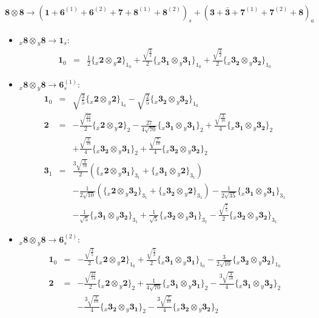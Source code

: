 \documentclass[english]{article}
\newcommand{\rep}[1]{\mathbf{#1}}
\newcommand{\repx}[2]{{}_{#2}\mathbf{#1}}
\newcommand{\subcg}[3]{\big\{ \repx{#1}{x}\otimes\repx{#2}{y}\big\}^{}_{#3}}
\begin{document}
\paragraph*{\Large $\rep{8}\otimes\rep{8}\to\left(\rep{1}+\rep{6}^{(1)}+\rep{6}^{(2)}+\rep{7}+\rep{8}^{(1)}+\rep{8}^{(2)}\right)_s+\left(\rep{3}+\rep{\bar{3}}+\rep{7}^{(1)}+\rep{7}^{(2)}+\rep{8}\right)_a$}
\begin{itemize}
\item $\repx{8}{x}\otimes\repx{8}{y}\to\rep{1}_{s}$:
\begin{eqnarray*}
\rep{1}_{0} &=& \frac{1}{2}\subcg{2}{2}{1_{0}}+\frac{\sqrt{\frac{3}{2}}}{2}\subcg{3_{1}}{3_{1}}{1_{0}}+\frac{\sqrt{\frac{3}{2}}}{2}\subcg{3_{2}}{3_{2}}{1_{0}}
\end{eqnarray*}
\item $\repx{8}{x}\otimes\repx{8}{y}\to\rep{6}_{s}^{(1)}$:
\begin{eqnarray*}
\rep{1}_{0} &=& \sqrt{\frac{3}{5}}\subcg{2}{2}{1_{0}}-\sqrt{\frac{2}{5}}\subcg{3_{2}}{3_{2}}{1_{0}}
\\
\rep{2} &=& -\frac{\sqrt{\frac{15}{14}}}{2}\subcg{2}{2}{2}-\frac{27}{4 \sqrt{70}}\subcg{3_{1}}{3_{1}}{2}+\frac{\sqrt{\frac{3}{10}}}{4}\subcg{3_{1}}{3_{2}}{2} \\ 
 & & +\frac{\sqrt{\frac{3}{10}}}{4}\subcg{3_{2}}{3_{1}}{2}+\frac{\sqrt{\frac{7}{10}}}{4}\subcg{3_{2}}{3_{2}}{2}
\\
\rep{3}_{1} &=& \frac{3 \sqrt{\frac{3}{70}}}{2}\left(\subcg{2}{3_{1}}{3_{1}}+\subcg{3_{1}}{2}{3_{1}}\right) \\ 
 & & -\frac{1}{2 \sqrt{10}}\left(\subcg{2}{3_{2}}{3_{1}}+\subcg{3_{2}}{2}{3_{1}}\right)-\frac{1}{2 \sqrt{35}}\subcg{3_{1}}{3_{1}}{3_{1}} \\ 
 & & -\frac{1}{\sqrt{5}}\subcg{3_{1}}{3_{2}}{3_{1}}+\frac{1}{\sqrt{5}}\subcg{3_{2}}{3_{1}}{3_{1}}-\frac{\sqrt{\frac{7}{5}}}{2}\subcg{3_{2}}{3_{2}}{3_{1}}
\end{eqnarray*}
\item $\repx{8}{x}\otimes\repx{8}{y}\to\rep{6}_{s}^{(2)}$:
\begin{eqnarray*}
\rep{1}_{0} &=& -\frac{\sqrt{\frac{3}{5}}}{2}\subcg{2}{2}{1_{0}}+\frac{\sqrt{\frac{5}{2}}}{2}\subcg{3_{1}}{3_{1}}{1_{0}}-\frac{3}{2 \sqrt{10}}\subcg{3_{2}}{3_{2}}{1_{0}}
\\
\rep{2} &=& -\frac{\sqrt{\frac{15}{14}}}{2}\subcg{2}{2}{2}+\frac{1}{4 \sqrt{70}}\subcg{3_{1}}{3_{1}}{2}-\frac{3 \sqrt{\frac{3}{10}}}{4}\subcg{3_{1}}{3_{2}}{2} \\ 
 & & -\frac{3 \sqrt{\frac{3}{10}}}{4}\subcg{3_{2}}{3_{1}}{2}-\frac{3 \sqrt{\frac{7}{10}}}{4}\subcg{3_{2}}{3_{2}}{2}

\end{eqnarray*}
\end{itemize}
\end{document}
